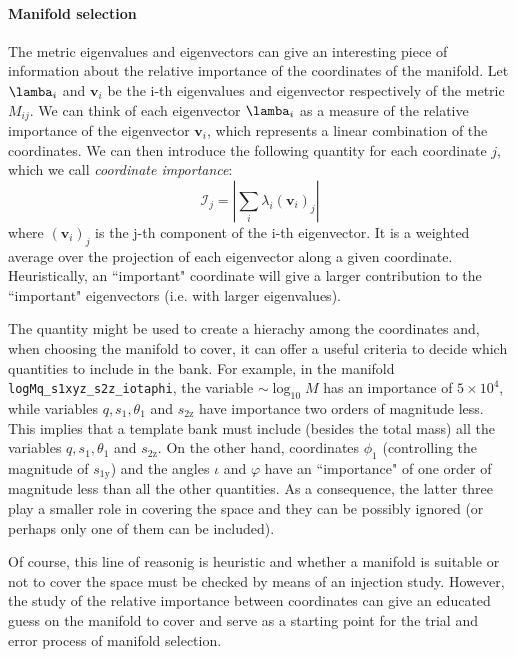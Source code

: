 \documentclass[twocolumn,showpacs,preprintnumbers,nofootinbib,prd,
superscriptaddress,10pt]{revtex4-2}
\begin{document}
\paragraph{Manifold selection}

The metric eigenvalues and eigenvectors can give an interesting piece of information about the relative importance of the coordinates of the manifold.
Let $\lamba_i$ and $\mathbf{v}_i$ be the i-th eigenvalues and eigenvector respectively of the metric $M_{ij}$.
We can think of each eigenvector $\lamba_i$ as a measure of the relative importance of the eigenvector $\mathbf{v}_i$, which represents a linear combination of the coordinates.
We can then introduce the following quantity for each coordinate $j$, which we call {\it coordinate importance}:
\begin{equation}
\mathcal{I}_j = \left| \sum_i \lambda_i (\mathbf{v}_i)_j \right|
\end{equation}
where $(\mathbf{v}_i)_j$ is the j-th component of the i-th eigenvector.
It is a weighted average over the projection of each eigenvector along a given coordinate. Heuristically, an ``important" coordinate will give a larger contribution to the ``important" eigenvectors (i.e. with larger eigenvalues).

The quantity might be used to create a hierachy among the coordinates and, when choosing the manifold to cover, it can offer a useful criteria to decide which quantities to include in the bank.
For example, in the manifold \texttt{logMq\_s1xyz\_s2z\_iotaphi}, the variable $\sim \log_{10}M$ has an importance of $5\times 10^4$, while variables $q, s_1, \theta_1$ and $s_\text{2z}$ have importance two orders of magnitude less. This implies that a template bank must include (besides the total mass) all the variables $q, s_1, \theta_1$ and $s_\text{2z}$.
On the other hand, coordinates $\phi_1$ (controlling the magnitude of $s_\text{1y}$) and the angles $\iota$ and $\varphi$ have an ``importance" of one order of magnitude less than all the other quantities. As a consequence, the latter three play a smaller role in covering the space and they can be possibly ignored (or perhaps only one of them can be included).

Of course, this line of reasonig is heuristic and whether a manifold is suitable or not to cover the space must be checked by means of an injection study. However, the study of the relative importance between coordinates can give an educated guess on the manifold to cover and serve as a starting point for the trial and error process of manifold selection.
\end{document}

